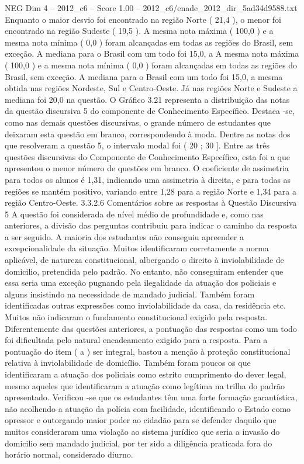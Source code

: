 \begin{textsample}{NEG Dim 4 – 2012\_c6 – Score 1.00 – 2012\_c6/enade\_2012\_dir\_5ad34d9588.txt}
Enquanto o maior desvio foi encontrado na região Norte ( 21,4 ), o menor foi encontrado na região Sudeste ( 19,5 ).
A mesma nota máxima ( 100,0 ) e a mesma nota mínima ( 0,0 ) foram alcançadas em todas as regiões do Brasil, sem exceção.
A mediana para o Brasil com um todo foi 15,0, a A mesma nota máxima ( 100,0 ) e a mesma nota mínima ( 0,0 ) foram alcançadas em todas as regiões do Brasil, sem exceção.
A mediana para o Brasil com um todo foi 15,0, a mesma obtida nas regiões Nordeste, Sul e Centro-Oeste.
Já nas regiões Norte e Sudeste a mediana foi 20,0 na questão.
O Gráfico 3.21 representa a distribuição das notas da questão discursiva 5 do componente de Conhecimento Específico.
Destaca -se, como nas demais questões discursivas, o grande número de estudantes que deixaram esta questão em branco, correspondendo à moda.
Dentre as notas dos que resolveram a questão 5, o intervalo modal foi ( 20 ; 30 ].
Entre as três questões discursivas do Componente de Conhecimento Específico, esta foi a que apresentou o menor número de questões em branco.
O coeficiente de assimetria para todos os alunos é 1,31, indicando uma assimetria à direita, e para todas as regiões se mantém positivo, variando entre 1,28 para a região Norte e 1,34 para a região Centro-Oeste. 3.3.2.6 Comentários sobre as respostas à Questão Discursiva 5 A questão foi considerada de nível médio de profundidade e, como nas anteriores, a divisão das perguntas contribuiu para indicar o caminho da resposta a ser seguido.
A maioria dos estudantes não conseguiu apreender a excepcionalidade da situação.
Muitos identificaram corretamente a norma aplicável, de natureza constitucional, albergando o direito à inviolabilidade de domicilio, pretendida pelo padrão.
No entanto, não conseguiram entender que essa seria uma exceção pugnando pela ilegalidade da atuação dos policiais e alguns insistindo na necessidade de mandado judicial.
Também foram identificadas outras expressões como inviolabilidade da casa, da residência etc.
Muitos não indicaram o fundamento constitucional exigido pela resposta.
Diferentemente das questões anteriores, a pontuação das respostas como um todo foi dificultada pelo natural encadeamento exigido para a resposta.
Para a pontuação do item ( a ) ser integral, bastou a menção à proteção constitucional relativa à inviolabilidade de domicílio.
Também foram poucos os que identificaram a atuação dos policiais como estrito cumprimento do dever legal, mesmo aqueles que identificaram a atuação como legítima na trilha do padrão apresentado.
Verificou -se que os estudantes têm uma forte formação garantística, não acolhendo a atuação da polícia com facilidade, identificando o Estado como opressor e outorgando maior poder ao cidadão para se defender daquilo que muitos consideraram uma violação ao sistema jurídico que seria a invasão do domicilio sem mandado judicial, por ter sido a diligência praticada fora do horário normal, considerado diurno.

\end{textsample}
